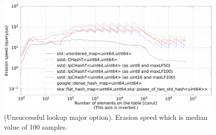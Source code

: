 \begin{figure}[h]
  \hspace{-3mm}
  \includegraphics[scale=0.24]{./fig_bench/erase_med.pdf}
  \caption{
    (Unsuccessful lookup major option). Erasion speed which is median value of 100 samples.
  }
  \label{fig_bench_erase_um}
\end{figure}
















